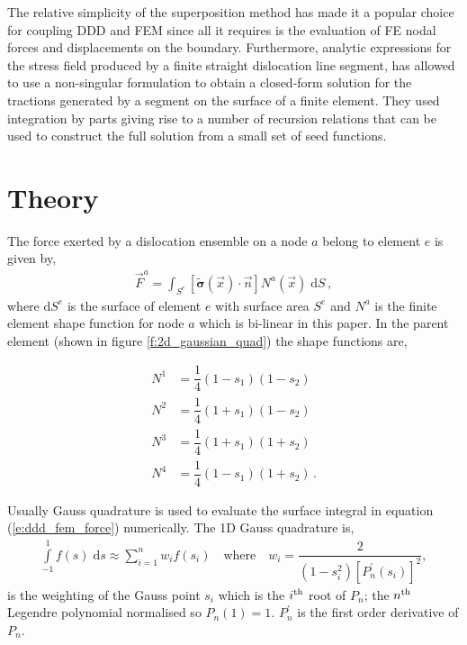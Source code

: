 \documentclass[11pt]{iopart}
\begin{document}
The relative simplicity of the superposition method has made it a popular choice for coupling DDD and FEM since all it requires is the evaluation of FE nodal forces and displacements on the boundary. Furthermore, analytic expressions for the stress field produced by a finite straight dislocation line segment, has allowed \citet{Queyreau} to use a non-singular formulation to obtain a closed-form solution for the tractions generated by a segment on the surface of a finite element. They used integration by parts giving rise to a number of recursion relations that can be used to construct the full solution from a small set of seed functions.

\section{Theory}\label{s:theory}

The force exerted by a dislocation ensemble on a node $a$ belong to element $e$ is given by,
%
\begin{align}
    \vec{F}^{a} = \int_{S^{e}} \left[\tilde{\bm{\sigma}}(\vec{x}) \cdot \vec{n}\right] N^{a}(\vec{x})\; \mathrm{d}S\,,
    \label{e:ddd_fem_force}
\end{align}
%
where $\mathrm{d}S^{e}$ is the surface of element $e$ with surface area $S^{e}$ and $N^{a}$ is the finite element shape function for node $a$ which is bi-linear in this paper. In the parent element (shown in figure  \ref{f:2d_gaussian_quad}) the shape functions are,

\begin{align}
    \label{e:shape_function}
    N^{1} & = \dfrac{1}{4}(1-s_1)(1-s_2)             \\
    N^{2} & = \dfrac{1}{4}(1+s_1)(1-s_2)\nonumber    \\
    N^{3} & = \dfrac{1}{4}(1+s_1)(1+s_2)\nonumber    \\
    N^{4} & = \dfrac{1}{4}(1-s_1)(1+s_2)\nonumber\,.
\end{align}

Usually Gauss quadrature is used to evaluate the surface integral in equation (\ref{e:ddd_fem_force}) numerically. The 1D Gauss quadrature is,
%
\begin{align}
    \label{e:gauss_leg}
    \int\limits_{-1}^{1} f(s)\;\mathrm{d}s \approx \sum\limits_{i=1}^{n} w_{i} f(s_{i}) \quad \textrm{where}\quad
    w_{i} = \dfrac{2}{\left(1-s_{i}^{2}\right) \left[P_{n}^{'}\left(s_{i}\right)\right]^{2}},
\end{align}
%
is the weighting of the Gauss point $s_{i}$ which is the $i\textsuperscript{th}$ root of $P_{n}$; the $n\textsuperscript{th}$ Legendre polynomial normalised so $P_{n}(1) = 1$. $P_{n}^{'}$ is the first order derivative of $P_{n}$.
\end{document}
